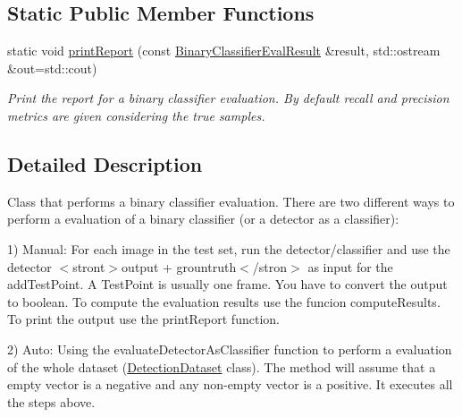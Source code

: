\subsection*{Static Public Member Functions}
\begin{DoxyCompactItemize}
\item 
\hypertarget{class_vision_core_1_1_evaluation_1_1_binary_classifier_evaluator_a54604d384e1a55cb93b04a640179eac0}{}static void \hyperlink{class_vision_core_1_1_evaluation_1_1_binary_classifier_evaluator_a54604d384e1a55cb93b04a640179eac0}{print\+Report} (const \hyperlink{struct_vision_core_1_1_evaluation_1_1_binary_classifier_eval_result}{Binary\+Classifier\+Eval\+Result} \&result, std\+::ostream \&out=std\+::cout)\label{class_vision_core_1_1_evaluation_1_1_binary_classifier_evaluator_a54604d384e1a55cb93b04a640179eac0}

\begin{DoxyCompactList}\small\item\em Print the report for a binary classifier evaluation. By default recall and precision metrics are given considering the \textquotesingle{}true\textquotesingle{} samples. \end{DoxyCompactList}\end{DoxyCompactItemize}


\subsection{Detailed Description}
Class that performs a binary classifier evaluation. There are two different ways to perform a evaluation of a binary classifier (or a detector as a classifier)\+:

1) Manual\+: For each image in the test set, run the detector/classifier and use the detector $<$stront$>$output + grountruth$<$/stron$>$ as input for the add\+Test\+Point. A Test\+Point is usually one frame. You have to convert the output to boolean. To compute the evaluation results use the funcion \textquotesingle{}compute\+Results\textquotesingle{}. To print the output use the \textquotesingle{}print\+Report\textquotesingle{} function.

2) Auto\+: Using the \textquotesingle{}evaluate\+Detector\+As\+Classifier\textquotesingle{} function to perform a evaluation of the whole dataset (\hyperlink{class_vision_core_1_1_evaluation_1_1_detection_dataset}{Detection\+Dataset} class). The method will assume that a empty vector is a negative and any non-\/empty vector is a positive. It executes all the steps above. 


